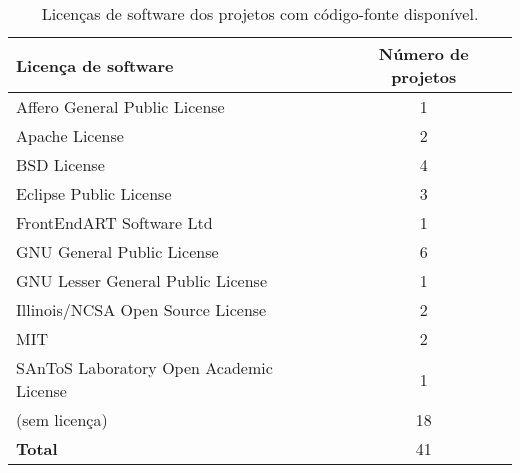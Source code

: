 \begin{table}[h]
\caption{Licenças de software dos projetos com código-fonte disponível.}
\centering
\begin{tabular}{l c}
  \hline
  {\bf Licença de software} & {\bf Número de projetos} \\
  \hline
  Affero General Public License & 1 \\
  Apache License & 2 \\
  BSD License & 4 \\
  Eclipse Public License & 3 \\
  FrontEndART Software Ltd & 1 \\
  GNU General Public License & 6 \\
  GNU Lesser General Public License & 1 \\
  Illinois/NCSA Open Source License & 2 \\
  MIT & 2 \\
  SAnToS Laboratory Open Academic License & 1 \\
  (sem licença) & 18 \\
  \hline
  {\bf Total} & 41 \\
  \hline
\end{tabular}
\label{license-table}
\end{table}

